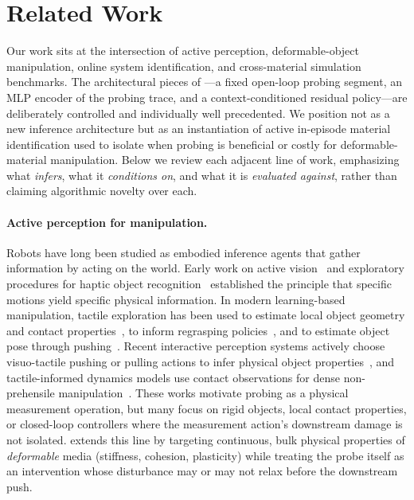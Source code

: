 \section{Related Work}
\label{sec:related}

Our work sits at the intersection of active perception, deformable-object manipulation, online system identification, and cross-material simulation benchmarks. The architectural pieces of \PTA{}---a fixed open-loop probing segment, an MLP encoder of the probing trace, and a context-conditioned residual policy---are deliberately controlled and individually well precedented. We position \PTA{} not as a new inference architecture but as an instantiation of active in-episode material identification used to isolate when probing is beneficial or costly for deformable-material manipulation. Below we review each adjacent line of work, emphasizing what \PTA{} \emph{infers}, what it \emph{conditions on}, and what it is \emph{evaluated against}, rather than claiming algorithmic novelty over each.

\paragraph{Active perception for manipulation.}
Robots have long been studied as embodied inference agents that gather information by acting on the world. Early work on active vision~\cite{bajcsy1988active} and exploratory procedures for haptic object recognition~\cite{lederman1987hand} established the principle that specific motions yield specific physical information. In modern learning-based manipulation, tactile exploration has been used to estimate local object geometry and contact properties~\cite{calandra2018more,xu2013tactile}, to inform regrasping policies~\cite{bauza2020tactile}, and to estimate object pose through pushing~\cite{yu2016more,bauza2018data}. Recent interactive perception systems actively choose visuo-tactile pushing or pulling actions to infer physical object properties~\cite{dutta2025predictive}, and tactile-informed dynamics models use contact observations for dense non-prehensile manipulation~\cite{ai2024robopack}. These works motivate probing as a physical measurement operation, but many focus on rigid objects, local contact properties, or closed-loop controllers where the measurement action's downstream damage is not isolated. \PTA{} extends this line by targeting continuous, bulk physical properties of \emph{deformable} media (stiffness, cohesion, plasticity) while treating the probe itself as an intervention whose disturbance may or may not relax before the downstream push.

